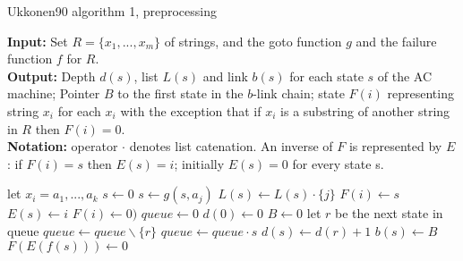 \documentclass[english,twoside,censored,csm,algorithms-track-2020]{HYthesisML}
\theoremstyle{plain}
\theoremstyle{definition}
\begin{document}
  \begin{algorithm}

    \caption{Ukkonen90 algorithm 1, preprocessing} \label{ukk-pre}
    \hspace*{\algorithmicindent} \textbf{Input:} Set $R=\{x_1,...,x_m\}$ of strings, and the goto function $g$ and the failure function $f$ for $R$.\\
    \hspace*{\algorithmicindent} \textbf{Output:} Depth $d(s)$, list $L(s)$ and link $b(s)$ for each state $s$ of the AC machine; Pointer $B$ to the first state in the $b$-link chain; state $F(i)$ representing string $x_i$ for each $x_i$ with the exception that if $x_i$ is a substring of another string in $R$ then $F(i) = 0$.\\
    \hspace*{\algorithmicindent} \textbf{Notation:} operator $\cdot$ denotes list catenation. An inverse of $F$ is represented by $E$: if $F(i) = s$ then $E(s) = i$; initially $E(s) = 0$ for every state s.\\
    
    \begin{algorithmic}[1]
          \hspace*{\algorithmicindent} let $x_i = a_1,...,a_k$
          \State $s\gets 0$
            \State $s\gets g(s,a_j)$
            \State $L(s)\gets L(s) \cdot \{j\}$
              \State $F(i)\gets s$
              \State $E(s)\gets i$
                \State $F(i)\gets 0)$
              \EndIf
            \EndIf
          \EndFor
        \EndFor
        \State $queue\gets 0$
        \State $d(0)\gets 0$
        \State $B\gets 0$
          \hspace*{\algorithmicindent} let $r$ be the next state in queue
          \State $queue\gets queue \backslash \{r\}$
            \State $queue\gets queue\cdot s$
            \State $d(s)\gets d(r)+1$
            \State $b(s)\gets B$
            \State $F(E(f(s)))\gets 0$
          \EndFor
        \EndWhile
      \EndFunction
        
    \end{algorithmic}
  \end{algorithm}
\end{document}
